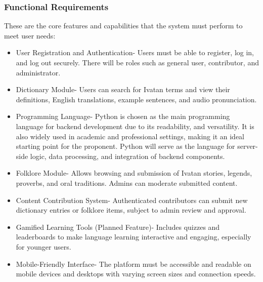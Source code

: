         \subsubsection{Functional Requirements}
        These are the core features and capabilities that the system must perform to meet user needs:
            \begin{itemize}
                \item User Registration and Authentication- Users must be able to register, log in, and log out securely. There will be roles such as general user, contributor, and administrator.
                \item Dictionary Module- Users can search for Ivatan terms and view their definitions, English translations, example sentences, and audio pronunciation.
                \item Programming Language- Python is chosen as the main programming language for backend development due to its readability, and versatility. It is also widely used in academic and professional settings, making it an ideal starting point for the proponent. Python will serve as the language for server-side logic, data processing, and integration of backend components.
                \item Folklore Module- Allows browsing and submission of Ivatan stories, legends, proverbs, and oral traditions. Admins can moderate submitted content.
                \item Content Contribution System- Authenticated contributors can submit new dictionary entries or folklore items, subject to admin review and approval.
                \item Gamified Learning Tools (Planned Feature)- Includes quizzes and leaderboards to make language learning interactive and engaging, especially for younger users.
                \item Mobile-Friendly Interface- The platform must be accessible and readable on mobile devices and desktops with varying screen sizes and connection speeds.
            \end{itemize}
